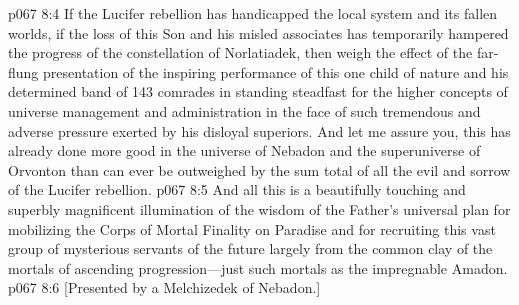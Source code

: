 \vs p067 8:4 If the Lucifer rebellion has handicapped the local system and its fallen worlds, if the loss of this Son and his misled associates has temporarily hampered the progress of the constellation of Norlatiadek, then weigh the effect of the far\hyp{}flung presentation of the inspiring performance of this one child of nature and his determined band of 143 comrades in standing steadfast for the higher concepts of universe management and administration in the face of such tremendous and adverse pressure exerted by his disloyal superiors. And let me assure you, this has already done more good in the universe of Nebadon and the superuniverse of Orvonton than can ever be outweighed by the sum total of all the evil and sorrow of the Lucifer rebellion.
\vs p067 8:5 And all this is a beautifully touching and superbly magnificent illumination of the wisdom of the Father’s universal plan for mobilizing the Corps of Mortal Finality on Paradise and for recruiting this vast group of mysterious servants of the future largely from the common clay of the mortals of ascending progression---just such mortals as the impregnable Amadon.
\vsetoff
\vs p067 8:6 [Presented by a Melchizedek of Nebadon.]

